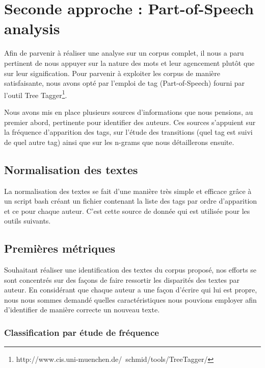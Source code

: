 \documentclass[a4paper,12pt]{report}
\begin{document}
\section{Seconde approche : Part-of-Speech analysis}

Afin de parvenir à réaliser une analyse sur un corpus complet, il nous a paru pertinent de nous appuyer sur la nature des mots et leur agencement plutôt que sur leur signification. Pour parvenir à exploiter les corpus de manière satisfaisante, nous avons opté par l'emploi de tag (Part-of-Speech) fourni par l'outil Tree Tagger\footnote{http://www.cis.uni-muenchen.de/~schmid/tools/TreeTagger/}.

Nous avons mis en place plusieurs sources d'informations que nous pensions, au premier abord, pertinente pour identifier des auteurs. Ces sources s’appuient sur la fréquence d'apparition des tags, sur l'étude des transitions (quel tag est suivi de quel autre tag) ainsi que sur les n-grams que nous détaillerons ensuite.



\subsection{Normalisation des textes}

La normalisation des textes se fait d'une manière très simple et efficace grâce à un script bash créant un fichier contenant la liste des tags par ordre d'apparition et ce pour chaque auteur. C'est cette source de donnée qui est utilisée pour les outils suivants. 

\subsection{Premières métriques}

Souhaitant réaliser une identification des textes du corpus proposé, nos efforts se sont concentrés sur des façons de faire ressortir les disparités des textes par auteur. En considérant que chaque auteur a une façon d'écrire qui lui est propre, nous nous sommes demandé quelles caractéristiques nous pouvions employer afin d'identifier de manière correcte un nouveau texte.

\subsubsection{Classification par étude de fréquence}
\end{document}
